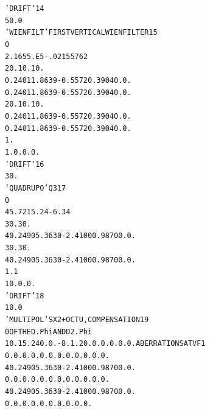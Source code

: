 \begin{tiny}
\begin{alltt}
   'DRIFT'                                                                14
     50.0                                                                       
    'WIENFILT'                         FIRST  VERTICAL  WIEN  FILTER      15
    0                                                       
   2.16  55.E5  -.0215576  2                                                    
   20. 10. 10.                                                                  
   0.2401  1.8639  -0.5572  0.3904 0. 0.                                        
   0.2401  1.8639  -0.5572  0.3904 0. 0.                                        
   20. 10. 10.                                                                  
   0.2401  1.8639  -0.5572  0.3904 0. 0.                                        
   0.2401  1.8639  -0.5572  0.3904 0. 0.                                        
   1.                                                       
  1. 0. 0. 0.                                                                   
   'DRIFT'                                                                16
     30.                                                                        
   'QUADRUPO'                            Q3                               17
   0                                                        
     45.72  15.24  -6.34                                                        
    30. 30.                                                                     
    4    0.2490   5.3630  -2.4100   0.9870   0.   0.                            
    30. 30.                                                                     
    4    0.2490   5.3630  -2.4100   0.9870   0.   0.                            
     1.1                                                                        
    1  0. 0. 0.                                                                 
   'DRIFT'                                                                18
    10.0                                                                        
   'MULTIPOL'                          SX2 + OCTU, COMPENSATION           19
   0                                   OF  THE  D.Phi  AND  D2.Phi            
   10.  15.24   0. 0. -8.  1.2  0. 0. 0. 0. 0. 0.    ABERRATIONS  AT  VF1       
    0. 0. 0. 0. 0. 0. 0. 0. 0. 0. 0. 0.                                         
    4    0.2490   5.3630  -2.4100   0.9870   0.   0.                            
    0. 0. 0. 0. 0. 0. 0. 0. 0. 0. 0. 0.                                         
    4    0.2490   5.3630  -2.4100   0.9870   0.   0.                            
   0. 0. 0. 0. 0. 0. 0. 0. 0. 0.                                                

\end{alltt}
\end{tiny}
